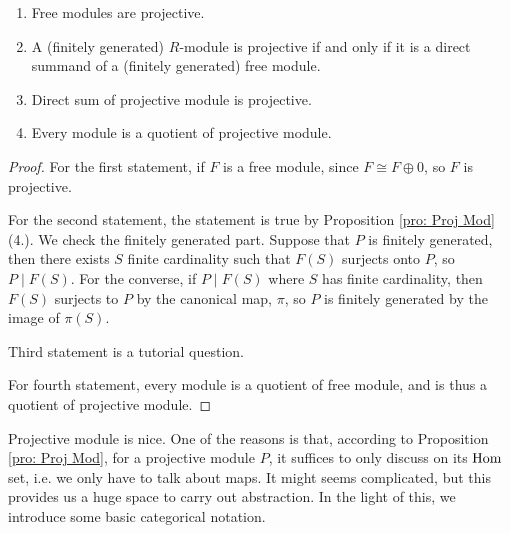 \medskip

\begin{cor}
    \hfill

    \begin{enumerate}
        \item Free modules are projective.
        \item A (finitely generated) $R$-module is projective if and only if it is a direct summand of a (finitely generated) free module.
        \item Direct sum of projective module is projective.
        \item Every module is a quotient of projective module. 
    \end{enumerate}
\end{cor}
\begin{proof}
    For the first statement, if $F$ is a free module, since $F\cong F\oplus 0$, so $F$ is projective.

    For the second statement, the statement is true by Proposition \ref{pro: Proj Mod}(4.). We check the finitely generated part. Suppose that $P$ is finitely generated, then there exists $S$ finite cardinality such that $F(S)$ surjects onto $P$, so $P\mid F(S)$. For the converse, if $P\mid F(S)$ where $S$ has finite cardinality, then $F(S)$ surjects to $P$ by the canonical map, $\pi$, so $P$ is finitely generated by the image of $\pi(S)$.

    Third statement is a tutorial question.

    For fourth statement, every module is a quotient of free module, and is thus a quotient of projective module.
\end{proof}

\begin{re}
    Projective module is nice. One of the reasons is that, according to Proposition \ref{pro: Proj Mod}, for a projective module $P$, it suffices to only discuss on its $\operatorname{Hom}$ set, i.e. we only have to talk about maps. It might seems complicated, but this provides us a huge space to carry out abstraction. In the light of this, we introduce some basic categorical notation.
\end{re}

\medskip

